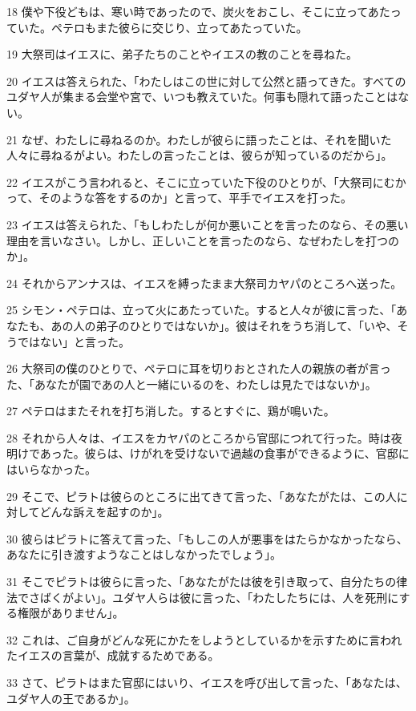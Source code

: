 \par 18 僕や下役どもは、寒い時であったので、炭火をおこし、そこに立ってあたっていた。ペテロもまた彼らに交じり、立ってあたっていた。
\par 19 大祭司はイエスに、弟子たちのことやイエスの教のことを尋ねた。
\par 20 イエスは答えられた、「わたしはこの世に対して公然と語ってきた。すべてのユダヤ人が集まる会堂や宮で、いつも教えていた。何事も隠れて語ったことはない。
\par 21 なぜ、わたしに尋ねるのか。わたしが彼らに語ったことは、それを聞いた人々に尋ねるがよい。わたしの言ったことは、彼らが知っているのだから」。
\par 22 イエスがこう言われると、そこに立っていた下役のひとりが、「大祭司にむかって、そのような答をするのか」と言って、平手でイエスを打った。
\par 23 イエスは答えられた、「もしわたしが何か悪いことを言ったのなら、その悪い理由を言いなさい。しかし、正しいことを言ったのなら、なぜわたしを打つのか」。
\par 24 それからアンナスは、イエスを縛ったまま大祭司カヤパのところへ送った。
\par 25 シモン・ペテロは、立って火にあたっていた。すると人々が彼に言った、「あなたも、あの人の弟子のひとりではないか」。彼はそれをうち消して、「いや、そうではない」と言った。
\par 26 大祭司の僕のひとりで、ペテロに耳を切りおとされた人の親族の者が言った、「あなたが園であの人と一緒にいるのを、わたしは見たではないか」。
\par 27 ペテロはまたそれを打ち消した。するとすぐに、鶏が鳴いた。
\par 28 それから人々は、イエスをカヤパのところから官邸につれて行った。時は夜明けであった。彼らは、けがれを受けないで過越の食事ができるように、官邸にはいらなかった。
\par 29 そこで、ピラトは彼らのところに出てきて言った、「あなたがたは、この人に対してどんな訴えを起すのか」。
\par 30 彼らはピラトに答えて言った、「もしこの人が悪事をはたらかなかったなら、あなたに引き渡すようなことはしなかったでしょう」。
\par 31 そこでピラトは彼らに言った、「あなたがたは彼を引き取って、自分たちの律法でさばくがよい」。ユダヤ人らは彼に言った、「わたしたちには、人を死刑にする権限がありません」。
\par 32 これは、ご自身がどんな死にかたをしようとしているかを示すために言われたイエスの言葉が、成就するためである。
\par 33 さて、ピラトはまた官邸にはいり、イエスを呼び出して言った、「あなたは、ユダヤ人の王であるか」。
